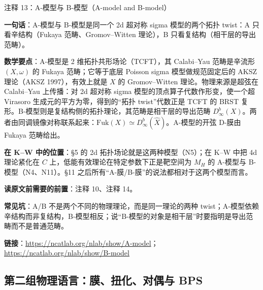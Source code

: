 \begin{kcard}{注释 13：A-模型与 B-模型（A-model and B-model）}

\textbf{一句话}：A-模型与 B-模型是同一个 2d 超对称 sigma 模型的两个拓扑 twist：A 只看辛结构（Fukaya 范畴、Gromov--Witten 理论），B 只看复结构（相干层的导出范畴）。

\textbf{数学要点}：A-模型是 2 维拓扑共形场论（TCFT），其 Calabi--Yau 范畴是辛流形 $(X,\omega)$ 的 Fukaya 范畴；它等于底层 Poisson sigma 模型做规范固定后的 AKSZ 理论（AKSZ 1997），有效上就是 $X$ 的 Gromov--Witten 理论。物理来源是超弦在 Calabi--Yau 上传播：对 2d 超对称 sigma 模型的顶点算子代数作形变，使一个超 Virasoro 生成元的平方为零，得到的“拓扑 twist”代数正是 TCFT 的 BRST 复形。B-模型则是复结构侧的拓扑理论，其范畴是相干层的导出范畴 $D^b_{\infty}(X)$。两者由同调镜像对称联系起来：$\mathrm{Fuk}(X)\simeq D^b_\infty(\widehat X)$。A-模型的开弦 D-膜由 Fukaya 范畴给出。

\textbf{在 K--W 中的位置}：§5 的 2d 拓扑场论就是这两种模型（N5）；在 K--W 中把 4d 理论紧化在 $C$ 上，低能有效理论在特定参数下正是靶空间为 $M_H$ 的 A-模型与 B-模型（N4、N11）。§11 之后所有“A-膜/B-膜”的说法都相对于这两个模型而言。

\textbf{读原文前需要的前置}：注释 10、注释 14。

\textbf{常见坑}：A/B 不是两个不同的物理理论，而是同一理论的两种 twist；A-模型依赖辛结构而非复结构，B-模型相反；说“B-模型的对象是相干层”时要指明是导出范畴而不是普通范畴。

\noindent\textbf{链接}：\url{https://ncatlab.org/nlab/show/A-model}；\url{https://ncatlab.org/nlab/show/B-model}
\end{kcard}

\subsection*{第二组\quad 物理语言：膜、扭化、对偶与 BPS}

